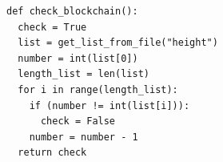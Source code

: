\documentclass[USenglish]{uit-thesis}
\begin{document}
\begin{appendices}
\begin{lstlisting}[float, caption={Check the status of the local blockhain, True if valid, False if not.}]
def check_blockchain():
  check = True
  list = get_list_from_file("height")
  number = int(list[0])
  length_list = len(list)
  for i in range(length_list):
    if (number != int(list[i])):
      check = False
    number = number - 1
  return check
\end{lstlisting}

\end{appendices}

%


%



\end{document}
